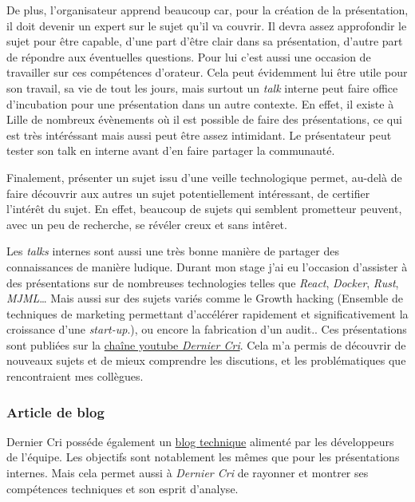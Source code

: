 \bigskip

De plus, l'organisateur apprend beaucoup car, pour la création de la
présentation, il doit devenir un expert sur le sujet qu'il va couvrir.
Il devra assez approfondir le sujet pour être capable, d'une part d'être
clair dans sa présentation, d'autre part de répondre aux éventuelles
questions. Pour lui c'est aussi une occasion de travailler sur ces
compétences d'orateur. Cela peut évidemment lui être utile pour son
travail, sa vie de tout les jours, mais surtout un \emph{talk} interne
peut faire office d'incubation pour une présentation dans un autre
contexte. En effet, il existe à Lille de nombreux évènements où il est
possible de faire des présentations, ce qui est très intéréssant mais
aussi peut être assez intimidant. Le présentateur peut tester son talk
en interne avant d'en faire partager la communauté.

\bigskip

Finalement, présenter un sujet issu d'une veille technologique permet,
au-delà de faire découvrir aux autres un sujet potentiellement
intéressant, de certifier l'intérêt du sujet. En effet, beaucoup de
sujets qui semblent prometteur peuvent, avec un peu de recherche, se
révéler creux et sans intêret.

\bigskip

Les \emph{talks} internes sont aussi une très bonne manière de partager
des connaissances de manière ludique. Durant mon stage j'ai eu
l'occasion d'assister à des présentations sur de nombreuses technologies
telles que \emph{React}, \emph{Docker}, \emph{Rust}, \emph{MJML}\ldots{}
Mais aussi sur des sujets variés comme le Growth hacking (Ensemble de
techniques de marketing permettant d'accélérer rapidement et
significativement la croissance d'une \emph{start-up}.), ou encore la
fabrication d'un audit.. Ces présentations sont publiées sur la
\href{https://www.youtube.com/channel/UCDfdBlzldhg_PEu3xZTPsHg}{chaîne
youtube \emph{Dernier Cri}}. Cela m'a permis de découvrir de nouveaux
sujets et de mieux comprendre les discutions, et les problématiques que
rencontraient mes collègues.

\bigskip

\subsubsection{Article de blog}\label{article-de-blog}

\bigskip

Dernier Cri posséde également un
\href{http://derniercri.io/tech-blog}{blog technique} alimenté par les
développeurs de l'équipe. Les objectifs sont notablement les mêmes que
pour les présentations internes. Mais cela permet aussi à \emph{Dernier
Cri} de rayonner et montrer ses compétences techniques et son esprit
d'analyse.

